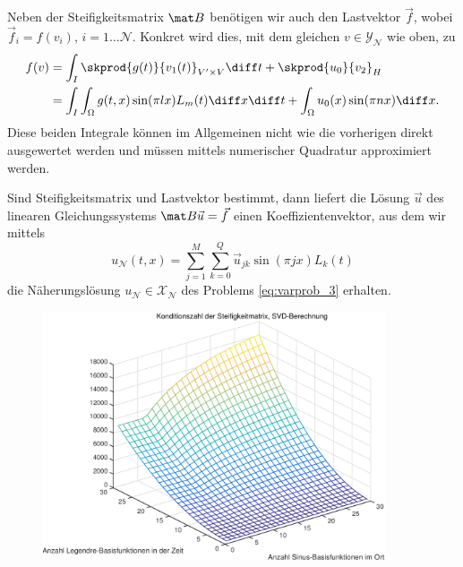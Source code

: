 Neben der Steifigkeitsmatrix $\mat B$ benötigen wir auch den Lastvektor $\vec f$, wobei $\vec f_{i} = f(v_{i})$, $i = 1 \dots \mathcal N$.
Konkret wird dies, mit dem gleichen $v \in \mathcal Y_{\mathcal N}$ wie oben, zu
\begin{align}
    f(v)
    &= \int_{I} \skprod{g(t)}{v_{1}(t)}_{V' \times V} \diff t + \skprod{u_{0}}{v_{2}}_{H}
    \\&= \int_{I} \int_{\Omega} g(t, x) \sin(\pi l x) L_{m}(t) \diff x \diff t + \int_{\Omega} u_{0}(x) \sin(\pi n x) \diff x.
\end{align}
Diese beiden Integrale können im Allgemeinen nicht wie die vorherigen direkt ausgewertet werden und müssen mittels numerischer Quadratur approximiert werden.

Sind Steifigkeitsmatrix und Lastvektor bestimmt, dann liefert die Lösung $\vec u$ des linearen Gleichungssystems $\mat B \vec u = \vec f$ einen Koeffizientenvektor, aus dem wir mittels
\begin{equation}
    u_{\mathcal N}(t, x) = \sum_{j = 1}^{M} \sum_{k = 0}^{Q} \vec u_{jk} \sin(\pi j x) L_{k}(t)
\end{equation}
die Näherungslösung $u_{\mathcal N} \in \mathcal X_{\mathcal N}$ des Problems \eqref{eq:varprob_3} erhalten.



\clearpage
\begin{figure}[tb]
    \begin{center}
        \includegraphics[width=0.9\textwidth]{figures/oned/conds.pdf}
    \end{center}
\end{figure}

